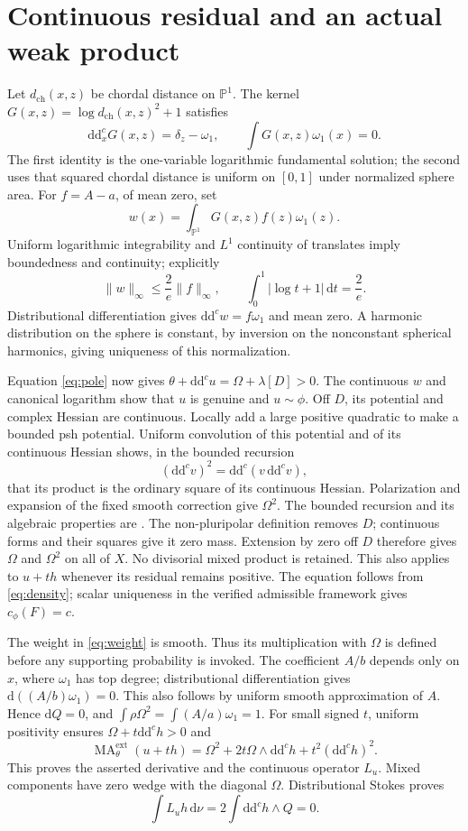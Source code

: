 \documentclass[11pt]{article}
\newcommand{\ddc}{\mathrm{d}\mathrm{d}^c}
\newcommand{\MA}{\operatorname{MA}}
\begin{document}
\section{Continuous residual and an actual weak product}

Let $d_{\mathrm{ch}}(x,z)$ be chordal distance on $\mathbb P^1$.
The kernel $G(x,z)=\log d_{\mathrm{ch}}(x,z)^2+1$ satisfies
\[
 \ddc_xG(x,z)=\delta_z-\omega_1,\qquad\int G(x,z)\omega_1(x)=0.
\]
The first identity is the one-variable logarithmic fundamental solution;
the second uses that squared chordal distance is uniform on $[0,1]$ under
normalized sphere area. For $f=A-a$, of mean zero, set
\[
 w(x)=\int_{\mathbb P^1}G(x,z)f(z)\omega_1(z).
\]
Uniform logarithmic integrability and $L^1$ continuity of translates imply
boundedness and continuity; explicitly
\[
 \|w\|_\infty\le\frac2e\|f\|_\infty,
 \qquad\int_0^1|\log t+1|\,\mathrm{d}t=\frac2e.
\]
Distributional differentiation gives $\ddc w=f\omega_1$ and mean zero.
A harmonic distribution on the sphere is constant, by inversion on the
nonconstant spherical harmonics, giving uniqueness of this normalization.

Equation \eqref{eq:pole} now gives
$\theta+\ddc u=\Omega+\lambda[D]>0$. The continuous $w$ and canonical
logarithm show that $u$ is genuine and $u\sim\phi$. Off $D$, its potential
and complex Hessian are continuous. Locally add a large positive quadratic
to make a bounded psh potential. Uniform convolution of this potential
and of its continuous Hessian shows, in the bounded recursion
\[
 (\ddc v)^2=\ddc(v\,\ddc v),
\]
that its product is the ordinary square of its continuous Hessian.
Polarization and expansion of the fixed smooth correction give $\Omega^2$.
The bounded recursion and its algebraic properties are
\cite[Section 2, (2.1), Theorem 2.1 and Corollary 2.2]{BT}.
The non-pluripolar definition removes $D$; continuous forms and their
squares give it zero mass. Extension by zero off $D$ therefore gives
$\Omega$ and $\Omega^2$ on all of $X$. No divisorial mixed product is retained.
This also applies to $u+t h$ whenever its residual remains positive.
The equation follows from \eqref{eq:density}; scalar uniqueness in the
verified admissible framework gives $c_\phi(F)=c$.

The weight in \eqref{eq:weight} is smooth. Thus its multiplication with
$\Omega$ is defined before any supporting probability is invoked.
The coefficient $A/b$ depends only on $x$, where $\omega_1$ has top degree;
distributional differentiation gives $\mathrm{d}((A/b)\omega_1)=0$.
This also follows by uniform smooth approximation of $A$. Hence
$\mathrm{d}Q=0$, and $\int\rho\Omega^2=\int(A/a)\omega_1=1$.
For small signed $t$, uniform positivity ensures $\Omega+t\ddc h>0$ and
\[
 \MA^{\mathrm{ext}}_\theta(u+t h)
 =\Omega^2+2t\Omega\wedge\ddc h+t^2(\ddc h)^2.
\]
This proves the asserted derivative and the continuous operator $L_u$.
Mixed components have zero wedge with the diagonal $\Omega$.
Distributional Stokes proves
\[
 \int L_uh\,\mathrm{d}\nu
 =2\int\ddc h\wedge Q=0.
 \]
\end{document}
